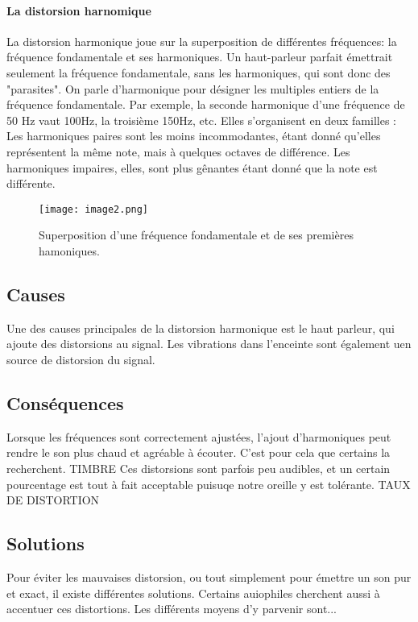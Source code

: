 \paragraph{La distorsion harnomique}
La distorsion harmonique joue sur la superposition de différentes fréquences:
la fréquence fondamentale et ses harmoniques. Un haut-parleur parfait émettrait seulement la fréquence fondamentale, sans les harmoniques, qui sont donc des "parasites".
On parle d'harmonique pour désigner les multiples entiers de la fréquence fondamentale.
Par exemple, la seconde harmonique d'une fréquence de 50 Hz vaut 100Hz, la troisième 150Hz, etc.
Elles s'organisent en deux familles : 
Les harmoniques paires sont les moins incommodantes, étant donné qu'elles représentent la même note, mais à quelques octaves de différence.
Les harmoniques impaires, elles, sont plus gênantes étant donné que la note est différente.

\begin{figure}[h]
\centering
\texttt{[image: image2.png]}
\caption{Superposition d'une fréquence fondamentale et de ses premières hamoniques.}
\label{Superposition d'une fréquence fondamentale et de ses premières hamoniques.}
\end{figure}

\subsection{Causes}
Une des causes principales de la distorsion harmonique est le haut parleur, qui ajoute des distorsions au signal.
Les vibrations dans l'enceinte sont également uen source de distorsion du signal.

\subsection{Conséquences}
Lorsque les fréquences sont correctement ajustées, l'ajout d'harmoniques peut rendre le son plus chaud et 
agréable à écouter. C'est pour cela que certains la recherchent.
TIMBRE
Ces distorsions sont parfois peu audibles, et un certain pourcentage est tout à fait acceptable puisuqe notre
oreille y est tolérante.
TAUX DE DISTORTION

\subsection{Solutions}
Pour éviter les mauvaises distorsion, ou tout simplement pour émettre un son pur et exact, il existe différentes
solutions.
Certains auiophiles cherchent aussi à accentuer ces distortions. Les différents  moyens d'y parvenir sont...

